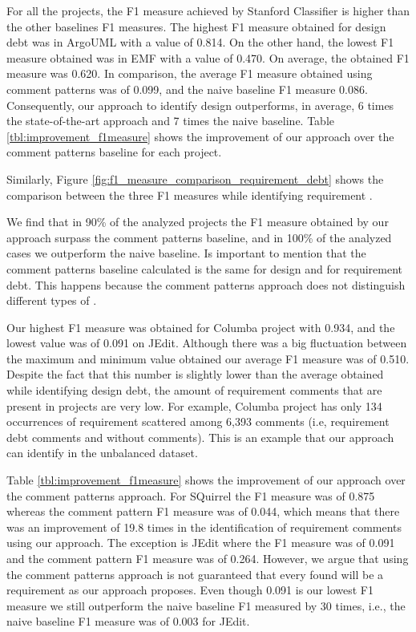 For all the projects, the F1 measure achieved by Stanford Classifier is higher than the other baselines F1 measures. The highest F1 measure obtained for design debt was in ArgoUML with a value of 0.814. On the other hand, the lowest F1 measure obtained was in EMF with a value of 0.470. On average, the obtained F1 measure was 0.620. In comparison, the average F1 measure obtained using comment patterns was of 0.099, and the naive baseline F1 measure 0.086. Consequently, our approach to identify design \SATD outperforms, in average, 6 times the state-of-the-art approach and 7 times the naive baseline. Table \ref{tbl:improvement_f1measure} shows the improvement of our approach over the comment patterns baseline for each project. 
 
Similarly, Figure \ref{fig:f1_measure_comparison_requirement_debt} shows the comparison between the three F1 measures while identifying requirement \SATD.

We find that in 90\% of the analyzed projects the F1 measure obtained by our approach surpass the comment patterns baseline, and in 100\% of the analyzed cases we outperform the naive baseline. Is important to mention that the comment patterns baseline calculated is the same for design and for requirement debt. This happens because the comment patterns approach does not distinguish different types of \SATD. 

Our highest F1 measure was obtained for Columba project with 0.934, and the lowest value was of 0.091 on JEdit. Although there was a big fluctuation between the maximum and minimum value obtained our average F1 measure was of 0.510. Despite the fact that this number is slightly lower than the average obtained while  identifying design debt, the amount of requirement \SATD comments that are present in projects are very low. For example, Columba project has only 134 occurrences of requirement \SATD scattered among 6,393 comments (i.e, requirement debt comments and without \SATD comments). This is an example that our approach can identify \SATD in the unbalanced dataset. 

Table \ref{tbl:improvement_f1measure} shows the improvement of our approach over the comment patterns approach. For SQuirrel the F1 measure was of 0.875 whereas the comment pattern F1 measure was of 0.044, which means that there was an improvement of 19.8 times in the identification of requirement \SATD comments using our approach. The exception is JEdit where the F1 measure was of 0.091 and the comment pattern F1 measure was of 0.264. However, we argue that using the comment patterns approach is not guaranteed that every \SATD found will be a requirement \SATD as our approach proposes. Even though 0.091 is our lowest F1 measure we still outperform the naive baseline F1 measured by 30 times, i.e., the naive baseline F1 measure was of 0.003 for JEdit. 

